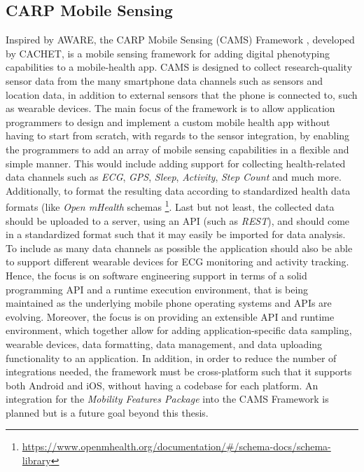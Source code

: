 \subsection{CARP Mobile Sensing}
Inspired by AWARE, the CARP Mobile Sensing (CAMS) Framework \cite{CAMS}, developed by CACHET, is a mobile sensing framework for adding digital phenotyping capabilities to a mobile-health app. CAMS is designed to collect research-quality sensor data from the many smartphone data channels such as sensors and location data, in addition to external sensors that the phone is connected to, such as wearable devices. The main focus of the framework is to allow application programmers to design and implement a custom mobile health app without having to start from scratch, with regards to the sensor integration, by enabling the programmers to add an array of mobile sensing capabilities in a flexible and simple manner. This would include adding support for collecting health-related data channels such as \textit{ECG}, \textit{GPS}, \textit{Sleep}, \textit{Activity}, \textit{Step Count} and much more. Additionally, to format the resulting data according to standardized health data formats (like \textit{Open mHealth} schemas \footnote{\url{https://www.openmhealth.org/documentation/#/schema-docs/schema-library}}. Last but not least, the collected data should be uploaded to a server, using an API (such as \textit{REST}), and should come in a standardized format such that it may easily be imported for data analysis. To include as many data channels as possible the application should also be able to support different wearable devices for ECG monitoring and activity tracking. Hence, the focus is on software engineering support in terms of a solid programming API and a runtime execution environment, that is being maintained as the underlying mobile phone operating systems and APIs are evolving. Moreover, the focus is on providing an extensible API and runtime environment, which together allow for adding application-specific data sampling, wearable devices, data formatting, data management, and data uploading functionality to an application. In addition, in order to reduce the number of integrations needed, the framework must be cross-platform such that it supports both Android and iOS, without having a codebase for each platform. An integration for the \textit{Mobility Features Package} into the CAMS Framework is planned but is a future goal beyond this thesis.